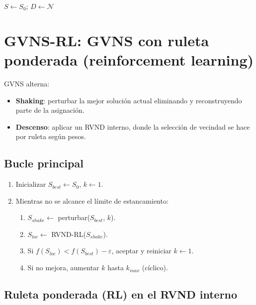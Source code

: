 \documentclass[12pt, a4paper]{report}
\begin{document}
\begin{algorithm}[H]
\DontPrintSemicolon
\caption{RVND (esquema implementado)}

$S \leftarrow S_0$; $D \leftarrow \mathcal{N}$\;
\end{algorithm}

\section{GVNS-RL: GVNS con ruleta ponderada (reinforcement learning)}

GVNS alterna:

\begin{itemize}
  \item \textbf{Shaking}: perturbar la mejor solución actual eliminando y reconstruyendo parte de la asignación.
  \item \textbf{Descenso}: aplicar un RVND interno, donde la selección de vecindad se hace por ruleta según pesos.
\end{itemize}

\subsection{Bucle principal}

\begin{enumerate}
  \item Inicializar $S_{best} \leftarrow S_0$, $k \leftarrow 1$.
  \item Mientras no se alcance el límite de estancamiento:
  \begin{enumerate}
    \item $S_{shake} \leftarrow$ perturbar($S_{best}$, $k$).
    \item $S_{loc} \leftarrow$ RVND-RL($S_{shake}$).
    \item Si $f(S_{loc}) < f(S_{best}) - \varepsilon$, aceptar y reiniciar $k\leftarrow 1$.
    \item Si no mejora, aumentar $k$ hasta $k_{max}$ (cíclico).
  \end{enumerate}
\end{enumerate}

\subsection{Ruleta ponderada (RL) en el RVND interno}
\end{document}
